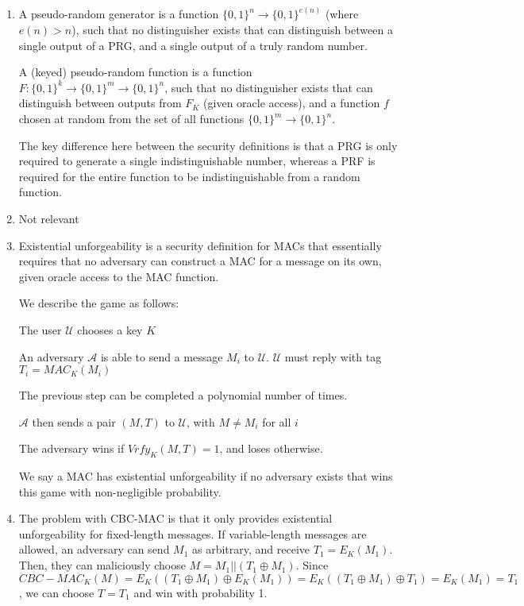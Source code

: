 


\begin{enumerate}[label=(\alph*)]

    \item
        A pseudo-random generator is a function $\{0,1\}^n \rightarrow \{0,1\}^{e(n)}$ (where $e(n) > n$), such that no distinguisher exists that can distinguish between a single output of a PRG, and a single output of a truly random number.

        A (keyed) pseudo-random function is a function $F : \{0,1\}^k \rightarrow \{0,1\}^m \rightarrow \{0,1\}^n$, such that no distinguisher exists that can distinguish between outputs from $F_K$ (given oracle access), and a function $f$ chosen at random from the set of all functions $\{0,1\}^m \rightarrow \{0,1\}^n$.

        The key difference here between the security definitions is that a PRG is only required to generate a single indistinguishable number, whereas a PRF is required for the entire function to be indistinguishable from a random function.

    \item
        Not relevant
    \item
        Existential unforgeability is a security definition for MACs that essentially requires that no adversary can construct a MAC for a message on its own, given oracle access to the MAC function.

        We describe the game as follows:

        The user $\mathcal{U}$ chooses a key $K$

        An adversary $\mathcal{A}$ is able to send a message $M_i$ to $\mathcal{U}$. $\mathcal{U}$ must reply with tag $T_i = MAC_K(M_i)$

        The previous step can be completed a polynomial number of times.

        $\mathcal{A}$ then sends a pair $(M,T)$ to $\mathcal{U}$, with $M \neq M_i$ for all $i$

        The adversary wins if $Vrfy_K(M,T) = 1$, and loses otherwise.

        We say a MAC has existential unforgeability if no adversary exists that wins this game with non-negligible probability.

    \item
        The problem with CBC-MAC is that it only provides existential unforgeability for fixed-length messages. If variable-length messages are allowed, an adversary can send $M_1$ as arbitrary, and receive $T_1 = E_K(M_1)$. Then, they can maliciously choose $M = M_1||(T_1 \oplus M_1)$. Since $CBC-MAC_K(M)= E_K((T_1 \oplus M_1) \oplus E_K(M_1)) = E_K((T_1 \oplus M_1) \oplus T_1) = E_K(M_1) = T_1$, we can choose $T = T_1$ and win with probability 1.


\end{enumerate}
